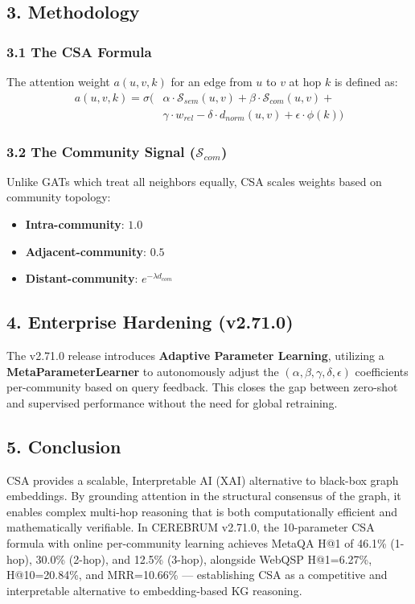 \subsection*{3. Methodology}

\subsubsection*{3.1 The CSA Formula}
The attention weight $a(u,v,k)$ for an edge from $u$ to $v$ at hop $k$ is defined as:
$$\begin{aligned}
a(u,v,k) = \sigma( & \alpha \cdot \mathcal{S}_{sem}(u,v) + \beta \cdot \mathcal{S}_{com}(u,v) + \\
& \gamma \cdot w_{rel} - \delta \cdot d_{norm}(u,v) + \epsilon \cdot \phi(k) )
\end{aligned}$$

\subsubsection*{3.2 The Community Signal ($\mathcal{S}_{com}$)}
Unlike GATs \cite{velickovic2018gat} which treat all neighbors equally, CSA scales weights based on community topology:
\begin{itemize}
  \item \textbf{Intra-community}: $1.0$
  \item \textbf{Adjacent-community}: $0.5$
  \item \textbf{Distant-community}: $e^{-\lambda d_{com}}$
\end{itemize}


\subsection*{4. Enterprise Hardening (v2.71.0)}
The v2.71.0 release introduces \textbf{Adaptive Parameter Learning}, utilizing a \textbf{MetaParameterLearner} to autonomously adjust the $(\alpha, \beta, \gamma, \delta, \epsilon)$ coefficients per-community based on query feedback. This closes the gap between zero-shot and supervised performance without the need for global retraining.

\subsection*{5. Conclusion}
CSA provides a scalable, Interpretable AI (XAI) alternative to black-box graph embeddings. By grounding attention in the structural consensus of the graph, it enables complex multi-hop reasoning that is both computationally efficient and mathematically verifiable. In CEREBRUM v2.71.0, the 10-parameter CSA formula with online per-community learning achieves MetaQA H@1 of 46.1\% (1-hop), 30.0\% (2-hop), and 12.5\% (3-hop), alongside WebQSP H@1=6.27\%, H@10=20.84\%, and MRR=10.66\% --- establishing CSA as a competitive and interpretable alternative to embedding-based KG reasoning.

